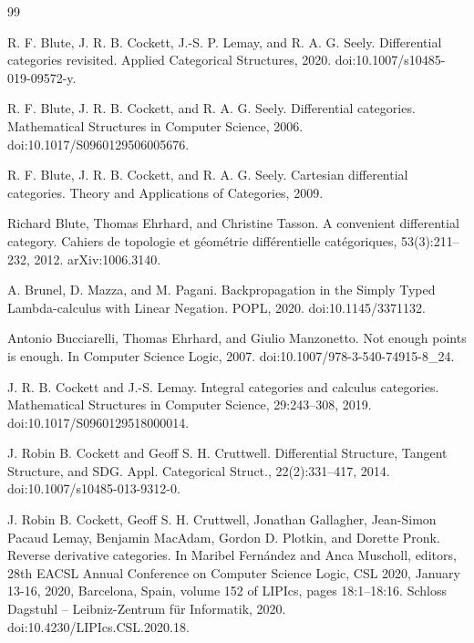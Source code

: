 \documentclass[10pt,a4paper]{article}
\begin{document}
\begin{thebibliography}{99}
\par\noindent    R. F. Blute, J. R. B. Cockett, J.-S. P. Lemay, and R. A. G. Seely.  Differential categories revisited.  Applied Categorical Structures, 2020.  doi:10.1007/s10485-019-09572-y.  

\par\noindent    R. F. Blute, J. R. B. Cockett, and R. A. G. Seely.  Differential categories.  Mathematical Structures in Computer Science, 2006.  doi:10.1017/S0960129506005676.  

\par\noindent    R. F. Blute, J. R. B. Cockett, and R. A. G. Seely.  Cartesian differential categories.  Theory and Applications of Categories, 2009.  

\par\noindent    Richard Blute, Thomas Ehrhard, and Christine Tasson.  A convenient differential category.  Cahiers de topologie et géométrie différentielle catégoriques, 53(3):211–232, 2012.  arXiv:1006.3140.  

\par\noindent    A. Brunel, D. Mazza, and M. Pagani.  Backpropagation in the Simply Typed Lambda-calculus with Linear Negation.  POPL, 2020.  doi:10.1145/3371132.  

\par\noindent    Antonio Bucciarelli, Thomas Ehrhard, and Giulio Manzonetto.  Not enough points is enough.  In Computer Science Logic, 2007.  doi:10.1007/978-3-540-74915-8\_24.  

\par\noindent    J. R. B. Cockett and J.-S. Lemay.  Integral categories and calculus categories.  Mathematical Structures in Computer Science, 29:243–308, 2019.  doi:10.1017/S0960129518000014.  

\par\noindent    J. Robin B. Cockett and Geoff S. H. Cruttwell.  Differential Structure, Tangent Structure, and SDG.  Appl. Categorical Struct., 22(2):331–417, 2014.  doi:10.1007/s10485-013-9312-0.  

\par\noindent    J. Robin B. Cockett, Geoff S. H. Cruttwell, Jonathan Gallagher, Jean-Simon Pacaud Lemay, Benjamin MacAdam, Gordon D. Plotkin, and Dorette Pronk.  Reverse derivative categories.  In Maribel Fernández and Anca Muscholl, editors, 28th EACSL Annual Conference on Computer Science Logic, CSL 2020, January 13-16, 2020, Barcelona, Spain, volume 152 of LIPIcs, pages 18:1–18:16. Schloss Dagstuhl – Leibniz-Zentrum für Informatik, 2020.  doi:10.4230/LIPIcs.CSL.2020.18.  


\end{thebibliography}
\end{document}
